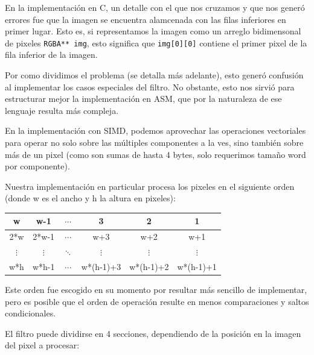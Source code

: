En la implementación en C, un detalle con el que nos cruzamos y que nos generó errores fue que la imagen se encuentra alamcenada con las filas inferiores en primer lugar. Esto es, si representamos la imagen como un arreglo bidimensonal de pixeles \texttt{RGBA** img}, esto significa que \texttt{img[0][0]} contiene el primer pixel de la fila inferior de la imagen.

Por como dividimos el problema (se detalla más adelante), esto generó confusión al implementar los casos especiales del filtro. No obstante, esto nos sirvió para estructurar mejor la implementación en ASM, que por la naturaleza de ese lenguaje resulta más compleja.

En la implementación con SIMD, podemos aprovechar las operaciones vectoriales para operar no solo sobre las múltiples componentes a la ves, sino también sobre más de un pixel (como son sumas de hasta 4 bytes, solo requerimos tamaño word por componente).

Nuestra implementación en particular procesa los pixeles en el siguiente orden (donde w es el ancho y h la altura en pixeles):

\begin{center}
  \begin{tabular}{ | c | c | c | c | c | c |}
    \hline
    w & w-1 & $\cdots$ & 3 & 2 & 1 \\ \hline
    2*w & 2*w-1 & $\cdots$ & w+3 & w+2 & w+1 \\ \hline
    $\vdots$ & $\vdots$ & $\ddots$ & $\vdots$ & $\vdots$ & $\vdots$ \\ \hline
    w*h & w*h-1 & $\cdots$ & w*(h-1)+3 & w*(h-1)+2 & w*(h-1)+1 \\
    \hline
  \end{tabular}
\end{center}

Este orden fue escogido en su momento por resultar más sencillo de implementar, pero es posible que el orden de operación resulte en menos comparaciones y saltos condicionales.

El filtro puede dividirse en 4 secciones, dependiendo de la posición en la imagen del pixel a procesar:

